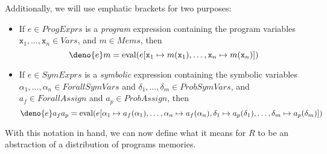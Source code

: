 \documentclass[acmsmall,review]{acmart}\settopmatter{}
\begin{document}
	Additionally, we will use emphatic brackets for two purposes:
	\begin{itemize}
		\item If $e \in ProgExprs$ is a \textit{program} expression containing the program variables $\mathtt{x}_1,\ldots,\mathtt{x}_n \in Vars$, and $m \in Mems$, then
		\[
		\deno{e}m = \text{eval}(e[\mathtt{x}_1 \mapsto m(\mathtt{x}_1),\ldots,\mathtt{x}_n \mapsto m(\mathtt{x}_n)])
		\]
		\item If $e \in SymExprs$ is a \textit{symbolic} expression containing the symbolic variables $\alpha_1,\ldots,\alpha_n \in ForallSymVars$ and $\delta_1,\ldots,\delta_m \in ProbSymVars$, and $a_f \in ForallAssign$ and $a_p \in ProbAssign$, then
		\[
		\deno{e}a_fa_p = \text{eval}(e[\alpha_1\mapsto a_f(\alpha_1),\ldots,\alpha_n \mapsto a_f(\alpha_n), \delta_1 \mapsto a_p(\delta_1), \ldots, \delta_m \mapsto a_p(\delta_m)])
		\]
	\end{itemize}
	
	With this notation in hand, we can now define what it means for $R$ to be an abstraction of a distribution of programs memories.
	
\end{document}
